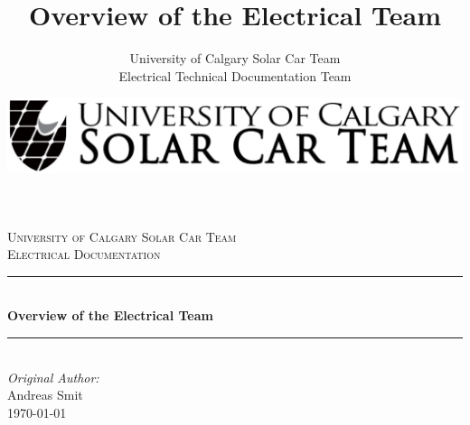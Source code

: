 \documentclass{article}
\title{Overview of the Electrical Team}
\author{University of Calgary Solar Car Team\\
        Electrical Technical Documentation Team}
\date{\includegraphics{images/logo.png}}
\begin{document}
    \begin{titlepage}
  
	    \newcommand{\HRule}{\rule{\linewidth}{0.5mm}} %
	    
	    \center %
	     
	    
	    \textsc{\LARGE University of Calgary Solar Car Team}\\[1.5cm] %
	    \textsc{\Large Electrical Documentation}\\[0.5cm] %
	    
	    
	    \HRule \\[0.4cm]
	      { \huge \bfseries Overview of the Electrical Team}\\[0.4cm] %
	    \HRule \\[1.5cm]
	     
	    
	    \Large \emph{Original Author:}\\
	    Andreas Smit\\[3cm] %
	    
	    
	    {\large \today}\\[2cm] %
	    
	    

\end{titlepage}
\end{document}
